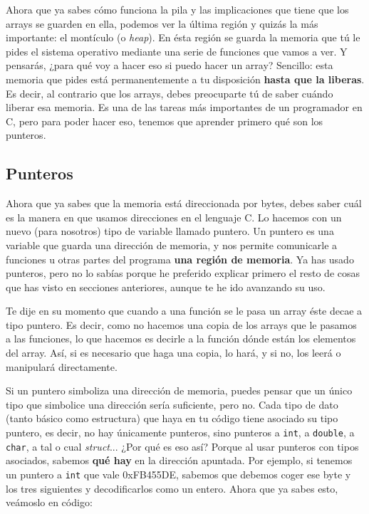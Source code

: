 \documentclass[a4paper]{article}
\begin{document}
Ahora que ya sabes cómo funciona la pila y las implicaciones que tiene que
los arrays se guarden en ella, podemos ver la última región y quizás la más
importante: el montículo (o \textit{heap}). En ésta región se guarda la memoria
que tú le pides el sistema operativo mediante una serie de funciones que vamos
a ver. Y pensarás, ¿para qué voy a hacer eso si puedo hacer un array? Sencillo:
esta memoria que pides está permanentemente a tu disposición \textbf{hasta que
la liberas}. Es decir, al contrario que los arrays, debes preocuparte tú de
saber cuándo liberar esa memoria. Es una de las tareas más importantes de
un programador en C, pero para poder hacer eso, tenemos que aprender primero
qué son los punteros.
\subsection{Punteros}
Ahora que ya sabes que la memoria está direccionada por bytes, debes saber cuál
es la manera en que usamos direcciones en el lenguaje C. Lo hacemos con un nuevo
(para nosotros) tipo de variable llamado puntero. Un puntero es
una variable que guarda una dirección de memoria, y nos permite comunicarle a
funciones u otras partes del programa \textbf{una región de memoria}.
Ya has usado punteros, pero no lo sabías porque he preferido explicar primero
el resto de cosas que has visto en secciones anteriores, aunque te he ido
avanzando su uso.

Te dije en su momento que cuando a una función se le pasa un array éste decae
a tipo puntero. Es decir, como no hacemos una copia de los arrays que le pasamos
a las funciones, lo que hacemos es decirle a la función dónde están los elementos
del array. Así, si es necesario que haga una copia, lo hará, y si no, los leerá
o manipulará directamente.

Si un puntero simboliza una dirección de memoria, puedes pensar que un único
tipo que simbolice una dirección sería suficiente, pero no. Cada tipo de dato
(tanto básico como estructura) que haya en tu código tiene asociado su tipo
puntero, es decir, no hay únicamente punteros, sino punteros a \verb!int!, a
\verb!double!, a \verb!char!, a tal o cual \textit{struct}... ¿Por qué es eso
así? Porque al usar punteros con tipos asociados, sabemos \textbf{qué hay} en la
dirección apuntada. Por ejemplo, si tenemos un puntero a \verb!int! que vale
0xFB455DE, sabemos que debemos coger ese byte y los tres siguientes
y decodificarlos como un entero. Ahora que ya sabes esto, veámoslo en código:
\end{document}

